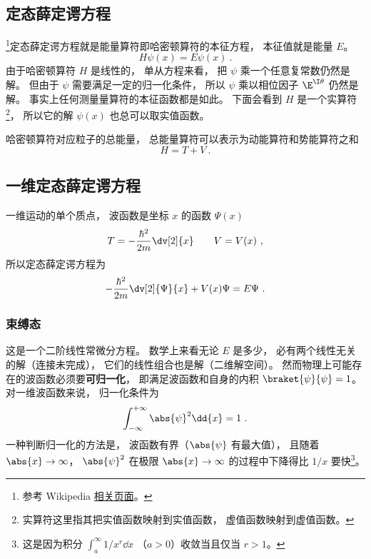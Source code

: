 

\subsection{定态薛定谔方程}
\footnote{参考 Wikipedia \href{https://en.wikipedia.org/wiki/Finite_potential_well}{相关页面}。}定态薛定谔方程就是能量算符即哈密顿算符的本征方程， 本征值就是能量 $E$。
\begin{equation}
H \psi(x) = E \psi(x)~.
\end{equation}
由于哈密顿算符 $H$ 是线性的， 单从方程来看， 把 $\psi$ 乘一个任意复常数仍然是解。 但由于 $\psi$ 需要满足一定的归一化条件， 所以 $\psi$ 乘以相位因子 $\E^{\I\theta}$ 仍然是解。 事实上任何测量量算符的本征函数都是如此。 下面会看到 $H$ 是一个实算符\footnote{实算符这里指其把实值函数映射到实值函数， 虚值函数映射到虚值函数。}， 所以它的解 $\psi(x)$ 也总可以取实值函数。

哈密顿算符对应粒子的总能量， 总能量算符可以表示为动能算符和势能算符之和
\begin{equation}
H = T + V~.
\end{equation}

\subsection{一维定态薛定谔方程}
一维运动的单个质点， 波函数是坐标 $x$ 的函数 $\Psi(x)$
\begin{equation}
T = -\frac{\hbar^2}{2m} \dv[2]{x} \qquad V = V(x)~,
\end{equation}
所以定态薛定谔方程为
\begin{equation}\label{eq_SchEq_1}
-\frac{\hbar^2}{2m} \dv[2]{\Psi}{x} + V(x)\Psi = E \Psi~.
\end{equation}

\subsubsection{束缚态}
这是一个二阶线性常微分方程。 数学上来看无论 $E$ 是多少， 必有两个线性无关的解（连接未完成）， 它们的线性组合也是解（二维解空间）。 然而物理上可能存在的波函数必须要\textbf{可归一化}， 即满足波函数和自身的内积 $\braket{\psi}{\psi} = 1$。 对一维波函数来说， 归一化条件为
\begin{equation}
\int_{-\infty}^{+\infty} \abs{\psi}^2 \dd{x} = 1~.
\end{equation}
一种判断归一化的方法是， 波函数有界（$\abs{\psi}$ 有最大值）， 且随着 $\abs{x} \to \infty$，  $\abs{\psi}^2$ 在极限 $\abs{x}\to\infty$ 的过程中下降得比 $1/x$ 要快\footnote{这是因为积分 $\int_a^\infty 1/x^r \dd{x}$ （$a > 0$）收敛当且仅当 $r > 1$。}。

